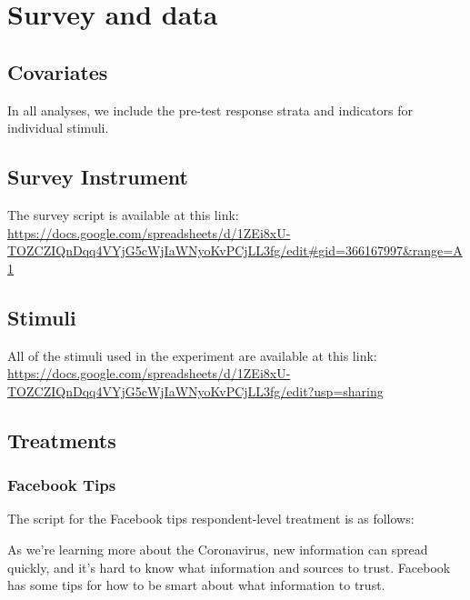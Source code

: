 \documentclass[letterpaper, 12pt, parskip=full,]{scrartcl}
\begin{document}
\section{Survey and data}\label{appendix:data}
\subsection{Covariates}\label{appendix:covariates}


In all analyses, we include the pre-test response strata and indicators for individual stimuli.

\subsection{Survey Instrument}\label{appendix:survey}%
The survey script is available at this link:\\
\url{https://docs.google.com/spreadsheets/d/1ZEi8xU-TOZCZIQnDqq4VYjG5cWjIaWNyoKvPCjLL3fg/edit#gid=366167997&range=A1}

\subsection{Stimuli}\label{appendis:stimuli}
All of the stimuli used in the experiment are available at this link:\\
\url{https://docs.google.com/spreadsheets/d/1ZEi8xU-TOZCZIQnDqq4VYjG5cWjIaWNyoKvPCjLL3fg/edit?usp=sharing}


\subsection{Treatments}

\subsubsection{Facebook Tips}\label{sec:fbtips}
The script for the Facebook tips respondent-level treatment is as follows:

As we're learning more about the Coronavirus, new information can spread quickly, and it's hard to know what information and sources to trust. Facebook has some tips for how to be smart about what information to trust. 
\end{document}
